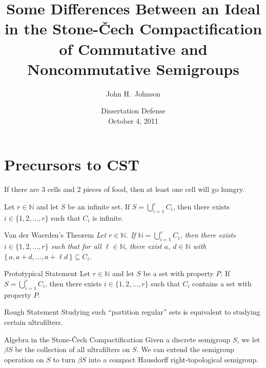 \documentclass{beamer}
\title{Some Differences Between an Ideal in the Stone-\v{C}ech Compactification of Commutative and Noncommutative Semigroups}
\author{John H.~Johnson}
\institute{
  Howard University\\
  Washington, DC
}
\date{
  Dissertation Defense\\
  October 4, 2011
}
\newcommand{\bbN}{\mathbb{N}}
\begin{document}
\begin{frame}
  \titlepage
\end{frame}

\section{Precursors to CST}
\begin{frame}
  \begin{theorem}
    If there are 3 cells and 2 pieces of food, then at least one cell
    will go hungry. 
  \end{theorem}

  \pause

  \begin{theorem}
    Let $r \in \bbN$ and let $S$ be an infinite set.
    If $S = \bigcup_{i=1}^r C_i$, then there exists $i \in \{1, 2,
    \ldots, r\}$ such that $C_i$ is infinite.
  \end{theorem}

  \pause
  
  \begin{block}{Van der Waerden's Theorem}
    \textsl{Let $r \in \bbN$.
    If $\bbN = \bigcup_{i=1}^r C_i$, then there exists $i \in \{1, 2,
    \ldots, r\}$ such that for all $\ell \in \bbN$, there exist $a$,
    $d \in \bbN$ with $\{\, a, a+d, \ldots, a + \ell d \,\} \subseteq
    C_i$.} 
  \end{block}
\end{frame}

\begin{frame}
  \begin{block}{Prototypical Statement}
    Let $r \in \bbN$ and let $S$ be a set with property $P$.
    If $S = \bigcup_{i=1}^r C_i$, then there exists $i \in \{1, 2,
    \ldots, r\}$ such that $C_i$ contains a set with property $P$. 
  \end{block}

  \pause

  \begin{block}{Rough Statement}
    Studying such ``partition regular'' sets is equivalent to studying
    certain ultrafilters. 
  \end{block}

  \pause

  \begin{block}{Algebra in the Stone-\v{C}ech Compactification}
    Given a discrete semigroup $S$, we let $\beta S$ be the collection
    of all ultrafilters on $S$.
    We can extend the semigroup operation on $S$ to turn $\beta S$
    into a compact Hausdorff right-topological semigroup. 
  \end{block}
\end{frame}
\end{document}
